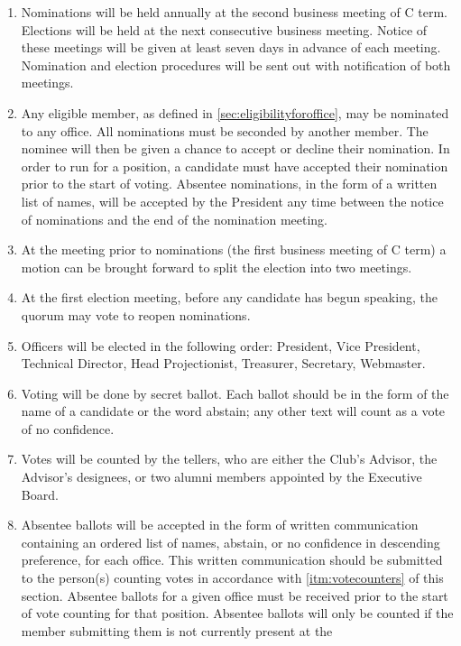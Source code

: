 \documentclass[12pt,letterpaper,oneside]{book}
\begin{document}
\begin{enumerate}

\item Nominations will be held annually at the second business meeting of C term. Elections will be held at the next consecutive business meeting. Notice of these meetings will be given at least seven days in advance of each meeting. Nomination and election procedures will be sent out with notification of both meetings.
\item Any eligible member, as defined in \cref{sec:eligibilityforoffice}, may be nominated to any office. All nominations must be seconded by another member. The nominee will then be given a chance to accept or decline their nomination. In order to run for a position, a candidate must have accepted their nomination prior to the start of voting. Absentee nominations, in the form of a written list of names, will be accepted by the President any time between the notice of nominations and the end of the nomination meeting.
\item At the meeting prior to nominations (the first business meeting of C term)  a motion can be brought forward to split the election into two meetings.
\item At the first election meeting, before any candidate has begun speaking, the quorum may vote to reopen nominations.
\item Officers will be elected in the following order: President, Vice
    President, Technical Director, Head Projectionist, Treasurer, Secretary, Webmaster.
\item Voting will be done by secret ballot. Each ballot should be in the form of the name of a candidate or the word abstain; any other text will count as a vote of no confidence.
\item \label{itm:votecounters} Votes will be counted by the tellers, who are either the Club’s Advisor, the Advisor’s designees, or two alumni members appointed by the Executive Board.
\item Absentee ballots will be accepted in the form of written communication
    containing an ordered list of names, abstain, or no confidence in descending
    preference, for each office. This written communication should be submitted
    to the person(s) counting votes in accordance with \cref{itm:votecounters}
    of this section. Absentee ballots for a given office must be received prior
    to the start of vote counting for that position. Absentee ballots will only
    be counted if the member submitting them is not currently present at the

\end{enumerate}
\end{document}
